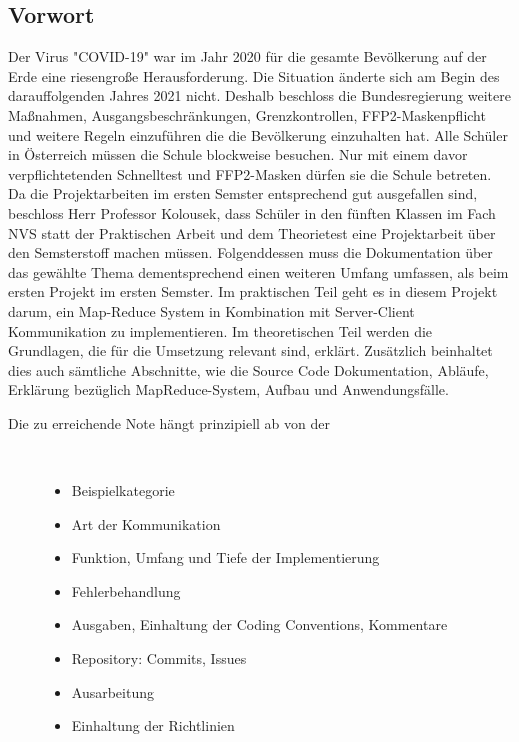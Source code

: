 \documentclass[a4paper,12pt]{article}
\begin{document}
\subsection{Vorwort}
Der Virus "COVID-19" war im Jahr 2020 für die gesamte Bevölkerung auf der Erde eine riesengroße Herausforderung. Die Situation änderte sich am Begin des darauffolgenden Jahres 2021 nicht.
Deshalb beschloss die Bundesregierung weitere Maßnahmen, Ausgangsbeschränkungen, Grenzkontrollen, FFP2-Maskenpflicht und weitere Regeln einzuführen die die Bevölkerung einzuhalten hat. Alle Schüler in Österreich müssen die Schule 
blockweise besuchen. 
Nur mit einem davor verpflichtetenden Schnelltest und FFP2-Masken dürfen sie die Schule betreten. Da die Projektarbeiten im ersten Semster entsprechend gut ausgefallen sind, beschloss Herr Professor 
Kolousek, dass Schüler in den fünften Klassen im Fach NVS statt der Praktischen Arbeit und dem Theorietest eine Projektarbeit über den Semsterstoff machen müssen. Folgenddessen muss die Dokumentation über das gewählte Thema dementsprechend einen
weiteren Umfang umfassen, als beim ersten Projekt im ersten Semster. Im praktischen Teil geht es in diesem Projekt darum, ein Map-Reduce System in Kombination mit Server-Client Kommunikation zu implementieren. Im theoretischen Teil werden die Grundlagen, die für die 
Umsetzung relevant sind, erklärt. Zusätzlich beinhaltet dies auch sämtliche Abschnitte, wie die Source Code Dokumentation, Abläufe, Erklärung bezüglich MapReduce-System, Aufbau und Anwendungsfälle.
\begin{description}
    \item[Die zu erreichende Note hängt prinzipiell ab von der] ~\par
    \begin{itemize}
        \item Beispielkategorie
        \item Art der Kommunikation
        \item Funktion, Umfang und Tiefe der Implementierung
        \item Fehlerbehandlung
        \item Ausgaben, Einhaltung der Coding Conventions, Kommentare
        \item Repository: Commits, Issues
        \item Ausarbeitung
        \item Einhaltung der Richtlinien
      
    \end{itemize} 
\end{description}
\end{document}
